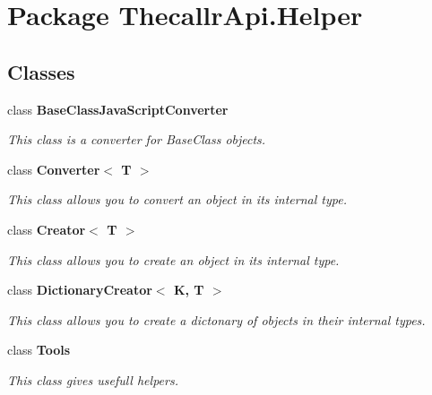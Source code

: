 \hypertarget{namespace_thecallr_api_1_1_helper}{\section{Package Thecallr\+Api.\+Helper}
\label{namespace_thecallr_api_1_1_helper}
}
\subsection*{Classes}
\begin{DoxyCompactItemize}
\item 
class {\bfseries Base\+Class\+Java\+Script\+Converter}
\begin{DoxyCompactList}\small\item\em This class is a converter for Base\+Class objects. \end{DoxyCompactList}\item 
class {\bfseries Converter$<$ T $>$}
\begin{DoxyCompactList}\small\item\em This class allows you to convert an object in its internal type. \end{DoxyCompactList}\item 
class {\bfseries Creator$<$ T $>$}
\begin{DoxyCompactList}\small\item\em This class allows you to create an object in its internal type. \end{DoxyCompactList}\item 
class {\bfseries Dictionary\+Creator$<$ K, T $>$}
\begin{DoxyCompactList}\small\item\em This class allows you to create a dictonary of objects in their internal types. \end{DoxyCompactList}\item 
class {\bfseries Tools}
\begin{DoxyCompactList}\small\item\em This class gives usefull helpers. \end{DoxyCompactList}\end{DoxyCompactItemize}
